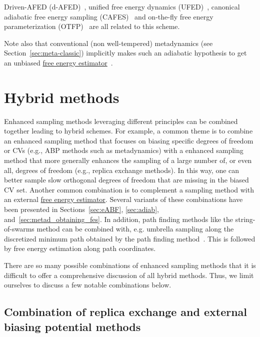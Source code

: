 \documentclass[9pt,review]{livecoms}
\begin{document}
Driven-AFED (d-AFED)~\cite{doi:10.1021/jp805039u}, unified free energy dynamics (UFED)~\cite{doi:10.1063/1.4733389}, canonical adiabatic free energy sampling (CAFES)~\cite{doi:10.1021/jp013346k} and on-the-fly free energy parameterization (OTFP)~\cite{ABRAMS2012114} are all related to this scheme.

Note also that conventional (non well-tempered) metadynamics (see Section~\ref{sec:meta-classic}) implicitly makes such an adiabatic hypothesis to get an unbiased \hyperlink{ref:FEestimator} {free energy estimator}~\cite{laio-gervasio-08, jourdain-lelievre-zitt-21}.


\section{Hybrid methods}
\label{sec:hybrids}

Enhanced sampling methods leveraging different principles can be combined together leading to hybrid schemes.
For example, a common theme is to combine an enhanced sampling method that focuses on biasing specific degrees of freedom or CVs (e.g., ABP methods such as metadynamics) with a enhanced sampling method that more generally enhances the sampling of a large number of, or even all, degrees of freedom (e.g., replica exchange methods). In this way, one can better sample slow orthogonal degrees of freedom that are missing in the biased CV set.
Another common combination is to complement a sampling method with an external \hyperlink{ref:FEestimator} {free energy estimator}. Several variants of these combinations have been presented in Sections~\ref{sec:eABF}, \ref{sec:adiab}, and~\ref{sec:metad_obtaining_fes}.
In addition, path finding methods like the string-of-swarms method can be combined with, e.g. umbrella sampling along the discretized minimum path obtained by the path finding method~\cite{doi:10.1021/jp0777059}. This is followed by free energy estimation along path coordinates.

There are so many possible combinations of enhanced sampling methods that it is difficult to offer a comprehensive discussion of all hybrid methods. Thus, we limit ourselves to discuss a few notable combinations below.


\subsection{Combination of replica exchange and external biasing potential methods}
\end{document}
